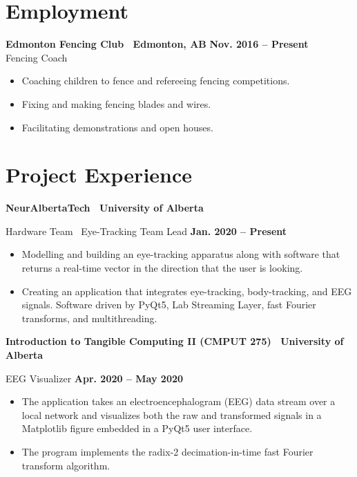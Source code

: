 \documentclass{article}
\begin{document}
\section*{\textcolor{my_red}{Employment}}
    \textbf{Edmonton Fencing Club \textbar\ Edmonton, AB} \hfill \textbf{Nov. 2016 -- Present}\\
    Fencing  Coach
    \begin{itemize}
        \item Coaching children to fence and refereeing fencing competitions.
        \item Fixing and making fencing blades and wires.
        \item Facilitating demonstrations and open houses.
    \end{itemize}


\section*{\textcolor{my_red}{Project Experience}}
    \textbf{NeurAlbertaTech \textbar\ University of Alberta}

    Hardware Team \textbar\ Eye-Tracking Team Lead \hfill \textbf{Jan. 2020 -- Present}
    \begin{itemize}
        \item Modelling and building an eye-tracking apparatus along with software that returns a real-time vector in the direction that the user is looking.
        \item Creating an application that integrates eye-tracking, body-tracking, and EEG signals. Software driven by PyQt5, Lab Streaming Layer, fast Fourier transforms, and multithreading.
    \end{itemize}

    \textbf{Introduction to Tangible Computing II (CMPUT 275) \textbar\ University of Alberta}

    EEG Visualizer \hfill \textbf{Apr. 2020 -- May 2020}
    \begin{itemize}
        \item The application takes an electroencephalogram (EEG) data stream over a local network and visualizes both the raw and transformed signals in a Matplotlib figure embedded in a PyQt5 user interface.
        \item The program implements the radix-2 decimation-in-time fast Fourier transform algorithm.
    \end{itemize}
\end{document}
